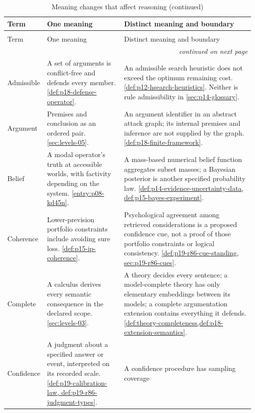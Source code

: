 \begin{longtable}{@{}p{}p{}p{}@{}}
\caption{Meaning changes that affect reasoning.}
\label{tab:p14-glossary-overloads}\\
\toprule
Term & One meaning & Distinct meaning and boundary \\
\midrule
\endfirsthead
\caption[]{Meaning changes that affect reasoning (continued)}\\
\toprule
Term & One meaning & Distinct meaning and boundary \\
\midrule
\endhead
\midrule\multicolumn{3}{r}{\emph{continued on next page}}\\
\endfoot
\endlastfoot
Admissible & A set of arguments is conflict-free and defends every member.
\cref{def:p18-defense-operator}. & An admissible search heuristic does not
exceed the optimum remaining cost. \cref{def:p12-hsearch-heuristics}.
Neither is rule admissibility in \cref{sec:p14-glossary}. \\
Argument & Premises and conclusion as an ordered pair.
\cref{sec:levels-05}. & An argument identifier in an abstract attack graph;
its internal premises and inference are not supplied by the graph.
\cref{def:p18-finite-framework}. \\
Belief & A modal operator's truth at accessible worlds, with factivity
depending on the system. \cref{entry:p08-kd45n}. & A mass-based numerical
belief function aggregates subset masses; a Bayesian posterior is another
specified probability law. \cref{def:p14-evidence-uncertainty-data,
def:p15-bayes-experiment}. \\
Coherence & Lower-prevision portfolio constraints include avoiding sure
loss. \cref{def:p15-ip-coherence}. & Psychological agreement among retrieved
considerations is a proposed confidence cue, not a proof of those portfolio
constraints or logical consistency. \cref{def:p19-r86-cue-standing,
sec:p19-r86-cues}. \\
Complete & A calculus derives every semantic consequence in the declared
scope. \cref{sec:levels-03}. & A theory decides every sentence; a model-complete
theory has only elementary embeddings between its models; a complete
argumentation extension contains everything it defends.
\cref{def:theory-completeness,def:p18-extension-semantics}. \\
Confidence & A judgment about a specified answer or event, interpreted on
its recorded scale. \cref{def:p19-calibration-law,
def:p19-r86-judgment-types}. & A confidence procedure has sampling coverage

\end{longtable}
